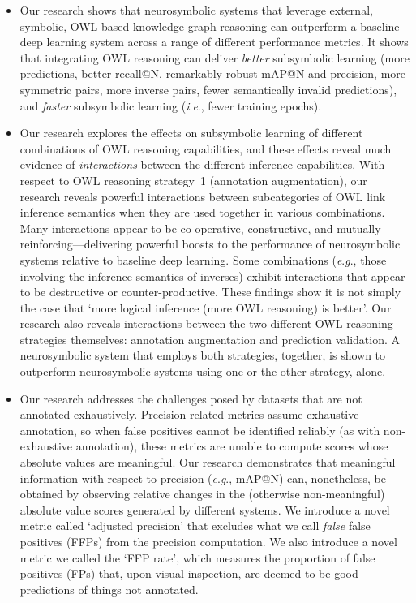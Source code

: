 \documentclass[]{jair}
\newcommand{\ie}{\textit{i}.\textit{e}.,\xspace}
\newcommand{\eg}{\textit{e}.\textit{g}.,\xspace}
\begin{document}
\begin{itemize}
    \item Our research shows that neurosymbolic systems that leverage external, symbolic, OWL-based knowledge graph reasoning can outperform a baseline deep learning system across a range of different performance metrics. It shows that integrating OWL reasoning can deliver \emph{better} subsymbolic learning (more predictions, better recall@N, remarkably robust mAP@N and precision, more symmetric pairs, more inverse pairs, fewer semantically invalid predictions), and \emph{faster} subsymbolic learning (\ie fewer training epochs).
    \item Our research explores the effects on subsymbolic learning of different combinations of OWL reasoning capabilities, and these effects reveal much evidence of \emph{interactions} between the different inference capabilities. With respect to OWL reasoning strategy~1 (annotation augmentation), our research reveals powerful interactions between subcategories of OWL link inference semantics when they are used together in various combinations. Many interactions appear to be co-operative, constructive, and mutually reinforcing---delivering powerful boosts to the performance of neurosymbolic systems relative to baseline deep learning. Some combinations (\eg those involving the inference semantics of inverses) exhibit interactions that appear to be destructive or counter-productive. These findings show it is not simply the case that `more logical inference (more OWL reasoning) is better'. Our research also reveals interactions between the two different OWL reasoning strategies themselves: annotation augmentation and prediction validation. A neurosymbolic system that employs both strategies, together, is shown to outperform neurosymbolic systems using one or the other strategy, alone.
    \item Our research addresses the challenges posed by datasets that are not annotated exhaustively. Precision-related metrics assume exhaustive annotation, so when false positives cannot be identified reliably (as with non-exhaustive annotation), these metrics are unable to compute scores whose absolute values are meaningful. Our research demonstrates that meaningful information with respect to precision (\eg mAP@N) can, nonetheless, be obtained by observing relative changes in the (otherwise non-meaningful) absolute value scores generated by different systems. We introduce a novel metric called `adjusted precision' that excludes what we call \emph{false} false positives (FFPs) from the precision computation. We also introduce a novel metric we called the `FFP rate', which measures the proportion of false positives (FPs) that, upon visual inspection, are deemed to be good predictions of things not annotated.

\end{itemize}
\end{document}
